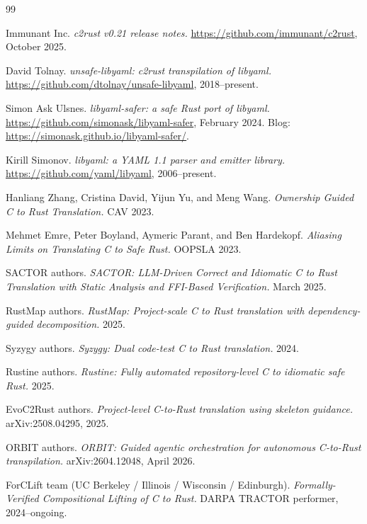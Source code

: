 \documentclass[12pt]{article}
\theoremstyle{definition}
\theoremstyle{remark}
\begin{document}
\begin{thebibliography}{99}

Immunant Inc. \emph{c2rust v0.21 release notes.}
\url{https://github.com/immunant/c2rust}, October 2025.

David Tolnay. \emph{unsafe-libyaml: c2rust transpilation of libyaml.}
\url{https://github.com/dtolnay/unsafe-libyaml}, 2018--present.

Simon Ask Ulsnes. \emph{libyaml-safer: a safe Rust port of libyaml.}
\url{https://github.com/simonask/libyaml-safer}, February 2024.
Blog: \url{https://simonask.github.io/libyaml-safer/}.

Kirill Simonov. \emph{libyaml: a YAML 1.1 parser and emitter library.}
\url{https://github.com/yaml/libyaml}, 2006--present.

Hanliang Zhang, Cristina David, Yijun Yu, and Meng Wang.
\emph{Ownership Guided C to Rust Translation.} CAV 2023.

Mehmet Emre, Peter Boyland, Aymeric Parant, and Ben Hardekopf.
\emph{Aliasing Limits on Translating C to Safe Rust.} OOPSLA 2023.

SACTOR authors.
\emph{SACTOR: LLM-Driven Correct and Idiomatic C to Rust Translation
with Static Analysis and FFI-Based Verification.} March 2025.

RustMap authors. \emph{RustMap: Project-scale C to Rust translation
with dependency-guided decomposition.} 2025.

Syzygy authors. \emph{Syzygy: Dual code-test C to Rust translation.}
2024.

Rustine authors. \emph{Rustine: Fully automated repository-level C to
idiomatic safe Rust.} 2025.

EvoC2Rust authors. \emph{Project-level C-to-Rust translation using
skeleton guidance.} arXiv:2508.04295, 2025.

ORBIT authors. \emph{ORBIT: Guided agentic orchestration for
autonomous C-to-Rust transpilation.} arXiv:2604.12048, April 2026.

ForCLift team (UC Berkeley / Illinois / Wisconsin / Edinburgh).
\emph{Formally-Verified Compositional Lifting of C to Rust.}
DARPA TRACTOR performer, 2024--ongoing.


\end{thebibliography}
\end{document}
